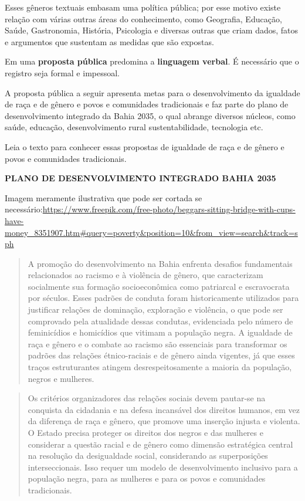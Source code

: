 \begin{itemize}
{Esses gêneros textuais embasam uma política pública; por esse motivo
existe relação com várias outras áreas do conhecimento, como Geografia,
Educação, Saúde, Gastronomia, História, Psicologia e diversas outras que
criam dados, fatos e argumentos que sustentam as medidas que são
expostas.

Em uma \textbf{proposta pública} predomina a \textbf{linguagem verbal}.
É necessário que o registro seja formal e impessoal.
}


A proposta pública a seguir apresenta metas para o desenvolvimento da
igualdade de raça e de gênero e povos e comunidades tradicionais e faz
parte do plano de desenvolvimento integrado da Bahia 2035, o qual
abrange diversos núcleos, como saúde, educação, desenvolvimento rural
sustentabilidade, tecnologia etc.

Leia o texto para conhecer essas propostas de igualdade de raça e de
gênero e povos e comunidades tradicionais.

\textbf{PLANO DE DESENVOLVIMENTO INTEGRADO BAHIA 2035}

Imagem meramente ilustrativa que pode ser cortada se
necessário:\url{https://www.freepik.com/free-photo/beggars-sitting-bridge-with-cups-have-money_8351907.htm\#query=poverty\&position=10\&from_view=search\&track=sph}

\begin{quote}
A promoção do desenvolvimento na Bahia enfrenta desafios fundamentais
relacionados ao racismo e à violência de gênero, que caracterizam
socialmente sua formação socioeconômica como patriarcal e escravocrata
por séculos. Esses padrões de conduta foram historicamente utilizados
para justificar relações de dominação, exploração e violência, o que
pode ser comprovado pela atualidade dessas condutas, evidenciada pelo
número de feminicídios e homicídios que vitimam a população negra. A
igualdade de raça e gênero e o combate ao racismo são essenciais para
transformar os padrões das relações étnico-raciais e de gênero ainda
vigentes, já que esses traços estruturantes atingem desrespeitosamente a
maioria da população, negros e mulheres.
\end{quote}

\begin{quote}
Os critérios organizadores das relações sociais devem pautar-se na
conquista da cidadania e na defesa incansável dos direitos humanos, em
vez da diferença de raça e gênero, que promove uma inserção injusta e
violenta. O Estado precisa proteger os direitos dos negros e das
mulheres e considerar a questão racial e de gênero como dimensão
estratégica central na resolução da desigualdade social, considerando as
superposições interseccionais. Isso requer um modelo de desenvolvimento
inclusivo para a população negra, para as mulheres e para os povos e
comunidades tradicionais.
\end{quote}


\end{itemize}
